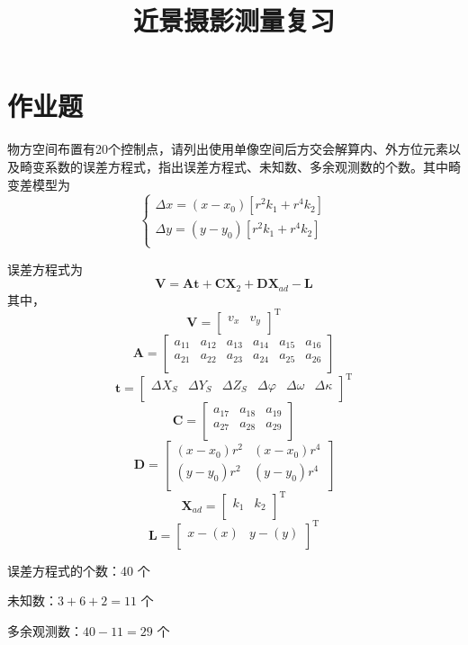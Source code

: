 \documentclass[a4paper]{ctexart}
\title{近景摄影测量复习}
\newtheorem{example}{\hskip 2em 例}
\newtheorem*{sol}{\hskip 2em 解}
\begin{document}
\setcounter{page}{1}
\pagestyle{plain}
\section*{作业题}
\begin{example}
物方空间布置有20个控制点，请列出使用单像空间后方交会解算内、外方位元素以及畸变系数的误差方程式，指出误差方程式、未知数、多余观测数的个数。其中畸变差模型为
$$
\begin{cases}
	\Delta x=\left( x-x_0 \right) \left[ r^2k_1+r^4k_2 \right]\\
	\Delta y=\left( y-y_0 \right) \left[ r^2k_1+r^4k_2 \right]\\
\end{cases}
$$
\end{example}
\begin{sol}
误差方程式为
$$
\boldsymbol{V}=\boldsymbol{At}+\boldsymbol{CX}_2+\boldsymbol{DX}_{ad}-\boldsymbol{L}
$$
其中，
$$
\boldsymbol{V}=\left[ \begin{matrix}
	v_x&		v_y\\
\end{matrix} \right] ^{\mathrm{T}}
$$
$$
\boldsymbol{A}=\left[ \begin{matrix}
	a_{11}&		a_{12}&		a_{13}&		a_{14}&		a_{15}&		a_{16}\\
	a_{21}&		a_{22}&		a_{23}&		a_{24}&		a_{25}&		a_{26}\\
\end{matrix} \right] 
$$
$$
\boldsymbol{t}=\left[ \begin{matrix}
	\Delta X_S&		\Delta Y_S&		\Delta Z_S&		\Delta \varphi&		\Delta \omega&		\Delta \kappa\\
\end{matrix} \right] ^{\mathrm{T}}
$$
$$
\boldsymbol{C}=\left[ \begin{matrix}
	a_{17}&		a_{18}&		a_{19}\\
	a_{27}&		a_{28}&		a_{29}\\
\end{matrix} \right] 
$$
$$
\boldsymbol{D}=\left[ \begin{matrix}
	\left( x-x_0 \right) r^2&		\left( x-x_0 \right) r^4\\
	\left( y-y_0 \right) r^2&		\left( y-y_0 \right) r^4\\
\end{matrix} \right] 
$$
$$
\boldsymbol{X}_{ad}=\left[ \begin{matrix}
	k_1&		k_2\\
\end{matrix} \right] ^{\mathrm{T}}
$$
$$
\boldsymbol{L}=\left[ \begin{matrix}
	x-\left( x \right)&		y-\left( y \right)\\
\end{matrix} \right] ^{\mathrm{T}}
$$

误差方程式的个数：40 个

未知数：$3+6+2=11$ 个

多余观测数：$40-11=29$ 个
\end{sol}
\end{document}
